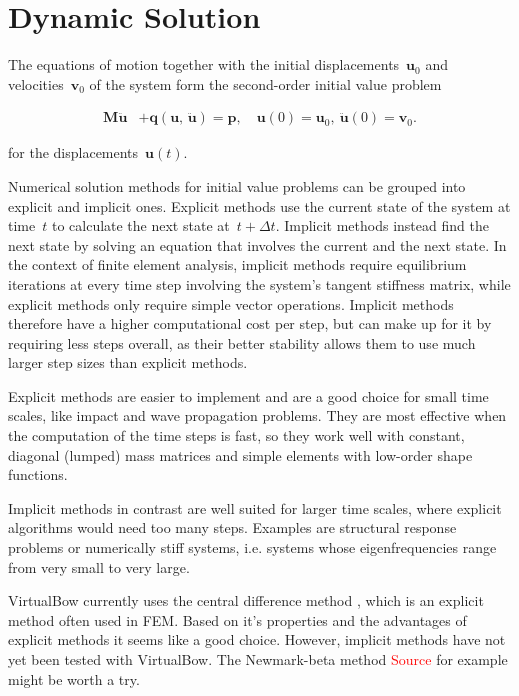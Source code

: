 \section{Dynamic Solution}

The equations of motion together with the initial displacements~$\boldsymbol{u}_0$ and velocities~$\boldsymbol{v}_0$ of the system form the second-order initial value problem

\begin{align}
\boldsymbol{M}\ddot{\boldsymbol{u}} &+ \boldsymbol{q}(\boldsymbol{u},\,\ddot{\boldsymbol{u}}) = \boldsymbol{p},\quad \boldsymbol{u}(0) = \boldsymbol{u}_0,\ \ddot{\boldsymbol{u}}(0) = \boldsymbol{v}_0.\label{eq:dynamics:system_equation}
\end{align}

for the displacements~$\boldsymbol{u}(t)$.

Numerical solution methods for initial value problems can be grouped into explicit and implicit ones.
Explicit methods use the current state of the system at time~$t$ to calculate the next state at~$t + \Delta t$.
Implicit methods instead find the next state by solving an equation that involves the current and the next state.
In the context of finite element analysis, implicit methods require equilibrium iterations at every time step involving the system's tangent stiffness matrix, while explicit methods only require simple vector operations.
Implicit methods therefore have a higher computational cost per step, but can make up for it by requiring less steps overall, as their better stability allows them to use much larger step sizes than explicit methods.

Explicit methods are easier to implement and are a good choice for small time scales, like impact and wave propagation problems.
They are most effective when the computation of the time steps is fast, so they work well with constant, diagonal (lumped) mass matrices and simple elements with low-order shape functions.

Implicit methods in contrast are well suited for larger time scales, where explicit algorithms would need too many steps.
Examples are structural response problems or numerically stiff systems, i.e. systems whose eigenfrequencies range from very small to very large.

VirtualBow currently uses the central difference method \cite{bib:dynamic_solution}, which is an explicit method often used in FEM.
Based on it's properties and the advantages of explicit methods it seems like a good choice.
However, implicit methods have not yet been tested with VirtualBow. The Newmark-beta method \textcolor{red}{Source} for example might be worth a try.

